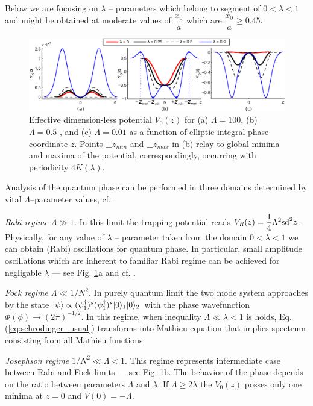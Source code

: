 \documentclass[aps, pre, preprint, groupedaddress, superscriptaddress, showkeys, showpacs] {revtex4-1}
\DeclarePairedDelimiter\ket{\lvert}{\rangle}
\begin{document}
Below we are focusing on $\lambda$ -- parameters which belong to segment of $0 < \lambda < 1$ and might be obtained at moderate values of $\dfrac{x_0}{a}$ which are $\dfrac{x_0}{a} \geq 0.45$. 

%
\begin{figure}[ht]
\begin{center}\includegraphics[width=1\linewidth]{pic/potentials.eps}
\end{center}
\caption{
Effective dimension-less potential $V_0(z)$ for (a) $\Lambda = 100$, (b) $\Lambda = 0.5$ , and (c) $\Lambda = 0.01$ as a function of  elliptic integral phase coordinate $z$.
Points $\pm z_{min}$ and $\pm z_{max}$ in (b) relay to global minima and maxima of the potential, correspondingly, occurring with periodicity $4K(\lambda)$. \label{phase_potential}}
\end{figure}
%

Analysis of the quantum phase can be performed  in three domains determined by vital $\Lambda$--parameter values, cf. \cite{Anglin}.

\textit{Rabi regime} $\Lambda \gg 1$. In this limit the trapping potential reads $V_R(z) = \dfrac{1}{4} \Lambda^2 \textrm{sd}^2{z}$.
Physically, for any value of $\lambda$ -- parameter taken from the domain 0$<\lambda <1$ we can obtain (Rabi) oscillations for quantum phase.
In particular, small amplitude oscillations which are inherent to familiar Rabi regime can be achieved for negligable $\lambda$ --- see Fig. \ref{phase_potential}a and cf. \cite{Anglin}.

\textit{Fock regime} $\Lambda \ll 1/N^2$.
In purely quantum limit the two mode system approaches by the state $\ket{\psi} \propto (\psi_1^\dag)^s (\psi_1^\dag)^s \ket{0}_1 \ket{0}_2$ with the phase wavefunction $\Phi(\phi) \to (2\pi)^{-1/2}$.
In this regime, when inequality $\Lambda \ll \lambda < 1$ is holds, Eq.(\ref{eq:schrodinger_usual}) transforms into Mathieu equation that implies spectrum consisting from all Mathieu functions.

\textit{Josephson regime} $1/N^2\ll\Lambda <1$.
This regime represents intermediate case between Rabi and Fock limits --- see Fig. \ref{phase_potential}b.
The behavior of the phase depends on the ratio between parameters $\Lambda$ and $\lambda$.
If $\Lambda \ge 2\lambda$ the $V_0(z)$ posses only one minima at $z = 0$ and $V(0) = -\Lambda$. 
\end{document}
